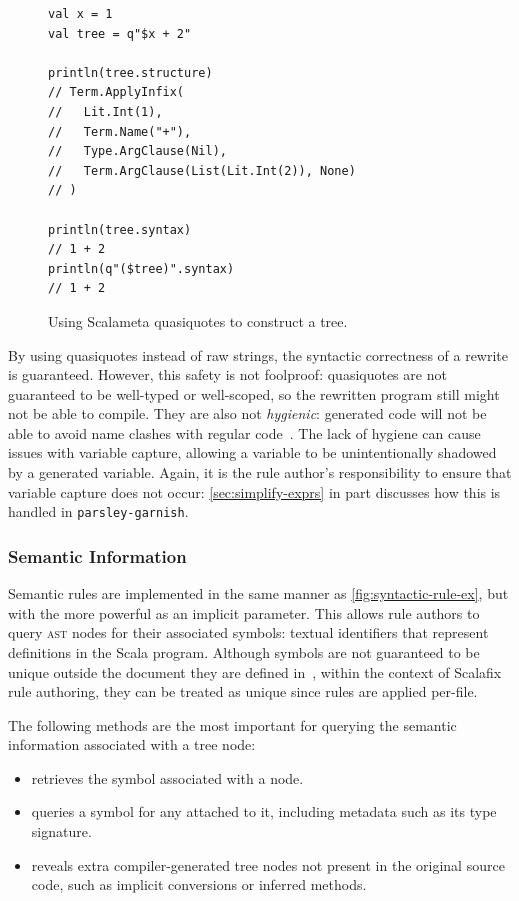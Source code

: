 \documentclass[../../main.tex]{subfiles}
\begin{document}
\begin{figure}[htbp]
\begin{verbatim}
val x = 1
val tree = q"$x + 2"

println(tree.structure)
// Term.ApplyInfix(
//   Lit.Int(1),
//   Term.Name("+"),
//   Type.ArgClause(Nil),
//   Term.ArgClause(List(Lit.Int(2)), None)
// )

println(tree.syntax)
// 1 + 2
println(q"($tree)".syntax)
// 1 + 2
\end{verbatim}
\caption{Using Scalameta quasiquotes to construct a tree.}
\label{fig:quasiquote-ex}
\end{figure}

\noindent %
By using quasiquotes instead of raw strings, the syntactic correctness of a rewrite is guaranteed.
However, this safety is not foolproof: quasiquotes are not guaranteed to be well-typed or well-scoped, so the rewritten program still might not be able to compile.
They are also not \emph{hygienic}: generated code will not be able to avoid name clashes with regular code~\cite{burmako_scalameta_2017}.
The lack of hygiene can cause issues with variable capture, allowing a variable to be unintentionally shadowed by a generated variable.
Again, it is the rule author's responsibility to ensure that variable capture does not occur: \cref{sec:simplify-exprs} in part discusses how this is handled in \texttt{parsley-garnish}.

\subsubsection{Semantic Information}
Semantic rules are implemented in the same manner as \cref{fig:syntactic-rule-ex}, but with the more powerful  as an implicit parameter.
This allows rule authors to query \textsc{ast} nodes for their associated symbols: textual identifiers that represent definitions in the Scala program.
Although symbols are not guaranteed to be unique outside the document they are defined in~\cite{scalameta_semanticdb_spec_2023}, within the context of Scalafix rule authoring, they can be treated as unique since rules are applied per-file.

The following methods are the most important for querying the semantic information associated with a tree node:
\begin{itemize}
  \item {} retrieves the symbol associated with a node.
  \item {} queries a symbol for any  attached to it, including metadata such as its type signature.
  \item {} reveals extra compiler-generated tree nodes not present in the original source code, such as implicit conversions or inferred  methods.
\end{itemize}
\end{document}
